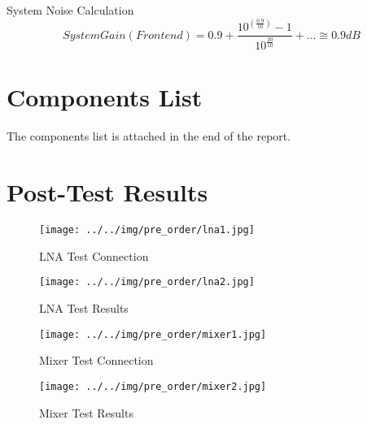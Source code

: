 \documentclass[]{article}
\begin{document}
    System Noise Calculation
    \begin{equation}
        System Gain (Front end) = 0.9 +
        \frac{10^(\frac{0.9}{10})-1}{10^\frac{20}{10}} + ... \cong 0.9dB
    \end{equation}

\section{Components List}
    The components list is attached in the end of the report.

\section{Post-Test Results}
    \begin{figure}[t!]
        \begin{center}
            \vspace{-0.3in}
            \texttt{[image: ../../img/pre\_order/lna1.jpg]}
            \label{fig:lna1}
            \caption{LNA Test Connection}
        \end{center}
    \end{figure}

    \begin{figure}[b!]
        \begin{center}
            \vspace{-0in}
            \texttt{[image: ../../img/pre\_order/lna2.jpg]}
            \label{fig:lna2}
            \caption{LNA Test Results}
        \end{center}
    \end{figure}

    \begin{figure}[t!]
        \begin{center}
            \vspace{-0.3in}
            \texttt{[image: ../../img/pre\_order/mixer1.jpg]}
            \label{fig:mixer1}
            \caption{Mixer Test Connection}
        \end{center}
    \end{figure}

    \begin{figure}[b!]
        \begin{center}
            \vspace{-0in}
            \texttt{[image: ../../img/pre\_order/mixer2.jpg]}
            \label{fig:mixer2}
            \caption{Mixer Test Results}
        \end{center}
    \end{figure}
\end{document}
